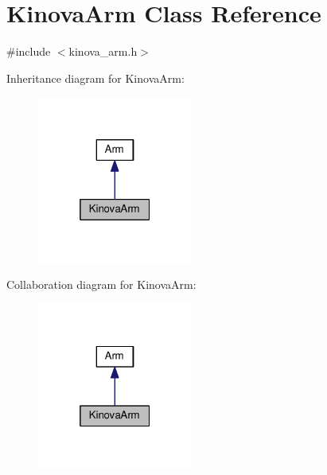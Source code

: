 \hypertarget{class_kinova_arm}{}\section{Kinova\+Arm Class Reference}
\label{class_kinova_arm}


{\ttfamily \#include $<$kinova\+\_\+arm.\+h$>$}



Inheritance diagram for Kinova\+Arm\+:\nopagebreak
\begin{figure}[H]
\begin{center}
\leavevmode
\includegraphics[width=145pt]{class_kinova_arm__inherit__graph}
\end{center}
\end{figure}


Collaboration diagram for Kinova\+Arm\+:\nopagebreak
\begin{figure}[H]
\begin{center}
\leavevmode
\includegraphics[width=145pt]{class_kinova_arm__coll__graph}
\end{center}
\end{figure}
